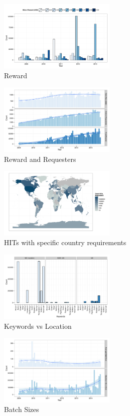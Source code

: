 \begin{figure}[htbp]
	\centering
		\includegraphics[width=0.5\textwidth]{figures/reward_year}
	\caption{Reward}
	\label{fig:reward_year}
\end{figure}

\begin{figure}[htbp]
	\centering
		\includegraphics[width=0.5\textwidth]{figures/requesters_reward}
	\caption{Reward and Requesters}
	\label{fig:requesters_reward}
\end{figure}

\begin{figure}[htbp]
	\centering
		\includegraphics[width=0.5\textwidth]{figures/map}
	\caption{HITs with specific country requirements}
	\label{fig:country}
\end{figure}

\begin{figure}[htbp]
	\centering
		\includegraphics[width=0.5\textwidth]{figures/keywords_location}
	\caption{Keywords vs Location}
	\label{fig:keyword_loc}
\end{figure}

\begin{figure}[htbp]
	\centering
		\includegraphics[width=0.5\textwidth]{figures/batch_size}
	\caption{Batch Sizes}
	\label{fig:batch_size}
\end{figure}

